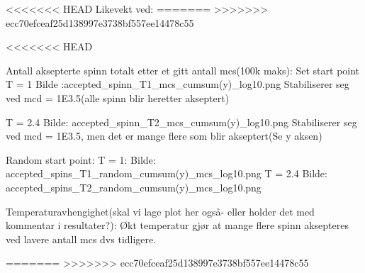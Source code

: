 \documentclass[../main.tex]{subfiles}
\begin{document}
<<<<<<< HEAD
Likevekt ved:
=======
>>>>>>> ecc70efceaf25d138997e3738bf557ee14478c55




<<<<<<< HEAD

Antall aksepterte spinn totalt etter et gitt antall mcs(100k maks):
Set start point
T = 1
Bilde :accepted_spinn_T1_mcs_cumsum(y)_log10.png
Stabiliserer seg ved mcd = 1E3.5(alle spinn blir heretter akseptert)

T = 2.4
Bilde: accepted_spinn_T2_mcs_cumsum(y)_log10.png
Stabiliserer seg ved mcd = 1E3.5, men det er mange flere som blir akseptert(Se y aksen)



Random start point:
T = 1:
Bilde: accepted_spins_T1_random_cumsum(y)_mcs_log10.png
T = 2.4
Bilde: accepted_spins_T2_random_cumsum(y)_mcs_log10.png

Temperaturavhengighet(skal vi lage plot her også- eller holder det med kommentar i resultater?):
Økt temperatur gjør at mange flere spinn aksepteres ved lavere antall mcs dvs tidligere.

=======
>>>>>>> ecc70efceaf25d138997e3738bf557ee14478c55

\end{document}
